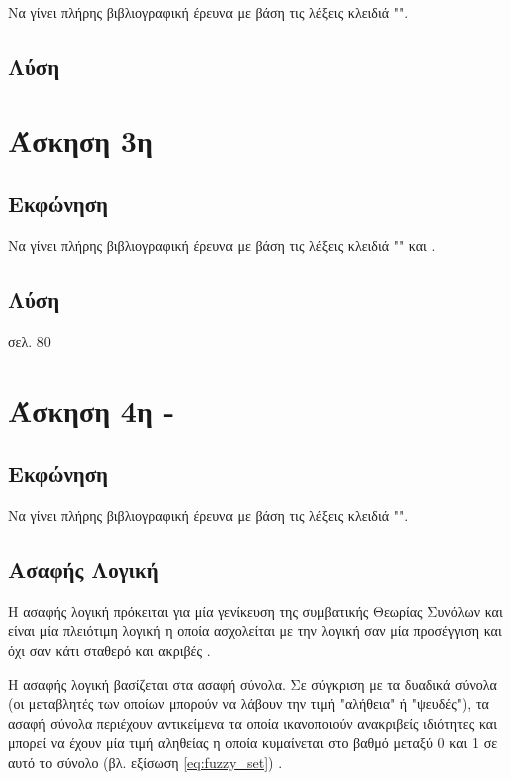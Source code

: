 \documentclass{assignment}
\begin{document}
Να γίνει πλήρης βιβλιογραφική έρευνα με βάση τις λέξεις κλειδιά "".

\subsection {Λύση}

\section{Άσκηση 3η}
\subsection{Εκφώνηση}

Να γίνει πλήρης βιβλιογραφική έρευνα με βάση τις λέξεις κλειδιά "" και .

\subsection {Λύση}

σελ. 80

\section{Άσκηση 4η - }
\subsection{Εκφώνηση}

Να γίνει πλήρης βιβλιογραφική έρευνα με βάση τις λέξεις κλειδιά "".

\subsection {Ασαφής Λογική}

Η ασαφής λογική πρόκειται για μία γενίκευση της συμβατικής Θεωρίας Συνόλων και είναι μία πλειότιμη λογική η οποία ασχολείται με την λογική σαν μία προσέγγιση και όχι σαν κάτι σταθερό και ακριβές \cite{engelbrecht,class_notes,wiki:fuzzy_logic,zadeh1994}. %

Η ασαφής λογική βασίζεται στα ασαφή σύνολα. Σε σύγκριση με τα δυαδικά σύνολα (οι μεταβλητές των οποίων μπορούν να λάβουν την τιμή "αλήθεια" ή "ψευδές"), τα ασαφή σύνολα περιέχουν αντικείμενα τα οποία ικανοποιούν ανακριβείς ιδιότητες και μπορεί να έχουν μία τιμή αληθείας η οποία κυμαίνεται στο βαθμό μεταξύ 0 και 1 σε αυτό το σύνολο (βλ. εξίσωση \eqref{eq:fuzzy_set}) \cite{zadeh1965338}. 
\end{document}
